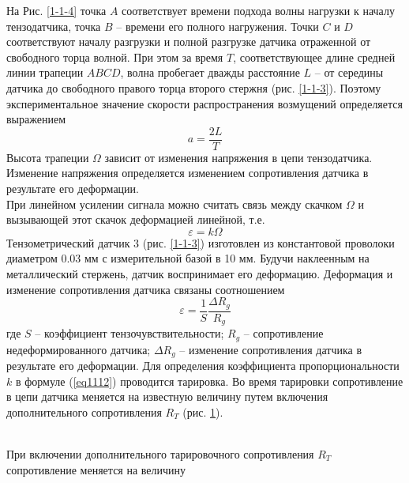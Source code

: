 \documentclass[specialist, subf, href, colorlinks=true, 14pt, final]{disser}
\theoremstyle{definition}
\begin{document}
На Рис. \ref{1-1-4} точка $A$ соответствует времени подхода волны нагрузки к началу тензодатчика, точка $B$ -- времени его полного нагружения. Точки $C$ и $D$ соответствуют началу разгрузки и полной разгрузке датчика отраженной от свободного торца волной. При этом за время $T$, соответствующее длине средней линии трапеции $ABCD$, волна пробегает дважды расстояние $L$ -- от середины датчика до свободного правого торца второго стержня (рис. \ref{1-1-3}). Поэтому экспериментальное значение скорости распространения возмущений 
определяется выражением
\[
  a = \frac{2L}{T}
\]
Высота трапеции $\Omega$ зависит от изменения напряжения в цепи тензодатчика. Изменение напряжения определяется изменением сопротивления датчика в результате его деформации.\\
При линейном усилении сигнала можно считать связь между скачком $\Omega$ и вызывающей этот скачок деформацией линейной, т.е.
\begin{equation}\label{eq1112}
  \varepsilon = k\Omega
\end{equation}
Тензометрический датчик 3 (рис. \ref{1-1-3}) изготовлен из константовой проволоки диаметром 0.03 мм с измерительной базой в 10 мм. Будучи наклеенным на металлический стержень, датчик воспринимает его деформацию. Деформация и изменение сопротивления датчика связаны соотношением
\begin{equation}\label{eq1113}
  \varepsilon = \frac{1}{S}\frac{\Delta R_{g}}{R_{g}}
\end{equation}
где $S$ -- коэффициент тензочувствительности; $R_g$ -- сопротивление недеформированного датчика; $\Delta R_{g}$ -- изменение сопротивления датчика в результате его деформации. Для определения коэффициента пропорциональности $k$ в формуле (\ref{eq1112}) проводится тарировка. Во время тарировки сопротивление в цепи датчика меняется на известную величину путем включения дополнительного сопротивления $R_T$ (рис. \ref{1-1-5}).
\begin{figure}[!htp]
  \caption{}
  \label{1-1-5}
\end{figure}
\\
При включении дополнительного тарировочного сопротивления $R_T$ сопротивление меняется на величину
\end{document}
